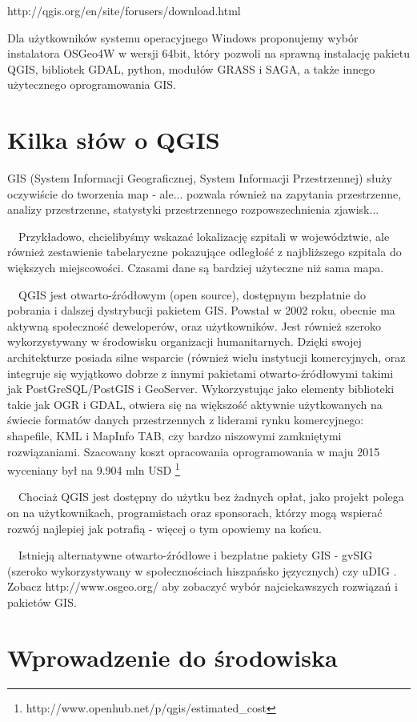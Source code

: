 \documentclass[12pt,a4paper]{book}
\begin{document}
http://qgis.org/en/site/forusers/download.html

Dla użytkowników systemu operacyjnego Windows proponujemy wybór instalatora OSGeo4W w wersji 64bit, który pozwoli na sprawną instalację pakietu QGIS, bibliotek GDAL, python, modułów GRASS i SAGA, a także innego użytecznego oprogramowania GIS.


\mainmatter
\chapter{Kilka słów o QGIS}
GIS (System Informacji Geograficznej, System Informacji Przestrzennej) służy oczywiście do tworzenia map - ale... pozwala również na zapytania przestrzenne, analizy przestrzenne, statystyki przestrzennego rozpowszechnienia zjawisk...

\ \ Przykładowo, chcielibyśmy wskazać lokalizację szpitali w województwie, ale również zestawienie tabelaryczne pokazujące odległość z najbliższego szpitala do większych miejscowości. Czasami dane są bardziej użyteczne niż sama mapa.

\ \ QGIS jest otwarto-źródłowym (open source), dostępnym bezpłatnie do pobrania i dalszej dystrybucji pakietem GIS. Powstał w 2002 roku, obecnie ma aktywną społeczność deweloperów, oraz użytkowników. Jest również szeroko wykorzystywany w środowisku organizacji humanitarnych. Dzięki swojej architekturze posiada silne wsparcie (również wielu instytucji komercyjnych, oraz integruje się wyjątkowo dobrze z innymi pakietami otwarto-źródłowymi takimi jak PostGreSQL/PostGIS i GeoServer. Wykorzystując jako elementy biblioteki takie jak OGR i GDAL, otwiera się na większość aktywnie użytkowanych na świecie formatów danych przestrzennych z liderami rynku komercyjnego: shapefile, KML i MapInfo TAB, czy bardzo niszowymi zamkniętymi rozwiązaniami. Szacowany koszt opracowania oprogramowania w maju 2015 wyceniany był na 9.904 mln USD \footnote{http://www.openhub.net/p/qgis/estimated\_cost}

\ \ Chociaż QGIS jest dostępny do użytku bez żadnych opłat, jako projekt polega on na użytkownikach, programistach oraz sponsorach, którzy mogą wspierać rozwój najlepiej jak potrafią - więcej o tym opowiemy na końcu.

\ \ Istnieją alternatywne otwarto-źródłowe i bezpłatne pakiety GIS - gvSIG (szeroko wykorzystywany w społecznościach hiszpańsko języcznych) czy uDIG . Zobacz http://www.osgeo.org/ aby zobaczyć wybór najciekawszych rozwiązań i pakietów GIS.

\chapter{Wprowadzenie do środowiska}
\end{document}

